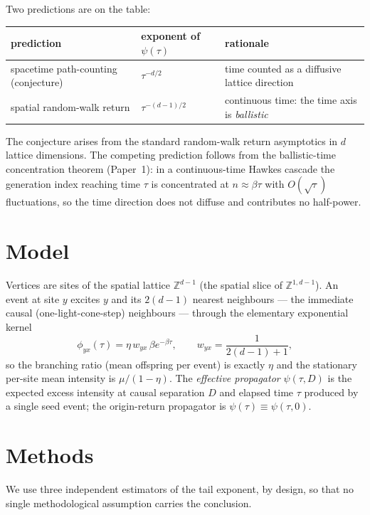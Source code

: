 \documentclass[11pt,a4paper]{article}
\begin{document}
Two predictions are on the table:
\begin{center}
\begin{tabular}{lll}
\toprule
prediction & exponent of $\psi(\tau)$ & rationale \\
\midrule
spacetime path-counting (conjecture) & $\tau^{-d/2}$ & time counted as a diffusive lattice direction \\
spatial random-walk return & $\tau^{-(d-1)/2}$ & continuous time: the time axis is \emph{ballistic} \\
\bottomrule
\end{tabular}
\end{center}
The conjecture arises from the standard random-walk return asymptotics in $d$ lattice dimensions. The competing prediction follows from the ballistic-time concentration theorem (Paper~1): in a continuous-time Hawkes cascade the generation index reaching time $\tau$ is concentrated at $n\approx\beta\tau$ with $O(\sqrt{\tau})$ fluctuations, so the time direction does not diffuse and contributes no half-power.

\section{Model}

Vertices are sites of the spatial lattice $\mathbb{Z}^{d-1}$ (the spatial slice of $\mathbb{Z}^{1,d-1}$). An event at site $y$ excites $y$ and its $2(d-1)$ nearest neighbours --- the immediate causal (one-light-cone-step) neighbours --- through the elementary exponential kernel
\begin{equation}
\phi_{yx}(\tau) = \eta\, w_{yx}\, \beta e^{-\beta\tau},
\qquad w_{yx} = \frac{1}{2(d-1)+1},
\end{equation}
so the branching ratio (mean offspring per event) is exactly $\eta$ and the stationary per-site mean intensity is $\mu/(1-\eta)$. The \emph{effective propagator} $\psi(\tau,D)$ is the expected excess intensity at causal separation $D$ and elapsed time $\tau$ produced by a single seed event; the origin-return propagator is $\psi(\tau)\equiv\psi(\tau,0)$.

\section{Methods}

We use three independent estimators of the tail exponent, by design, so that no single methodological assumption carries the conclusion.
\end{document}
